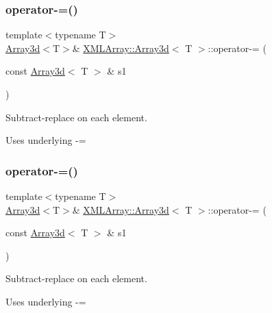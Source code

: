\subsubsection{\texorpdfstring{operator-\/=()}{operator-=()}\hspace{0.1cm}{\footnotesize\ttfamily [2/3]}}
{\footnotesize\ttfamily template$<$typename T$>$ \\
\mbox{\hyperlink{classXMLArray_1_1Array3d}{Array3d}}$<$T$>$\& \mbox{\hyperlink{classXMLArray_1_1Array3d}{X\+M\+L\+Array\+::\+Array3d}}$<$ T $>$\+::operator-\/= (\begin{DoxyParamCaption}\item[{const \mbox{\hyperlink{classXMLArray_1_1Array3d}{Array3d}}$<$ T $>$ \&}]{s1 }\end{DoxyParamCaption})\hspace{0.3cm}{\ttfamily [inline]}}



Subtract-\/replace on each element. 

Uses underlying -\/= \mbox{\label{classXMLArray_1_1Array3d_a9d4e2f24b2d52634a926ec4fb758828b}} 
\subsubsection{\texorpdfstring{operator-\/=()}{operator-=()}\hspace{0.1cm}{\footnotesize\ttfamily [3/3]}}
{\footnotesize\ttfamily template$<$typename T$>$ \\
\mbox{\hyperlink{classXMLArray_1_1Array3d}{Array3d}}$<$T$>$\& \mbox{\hyperlink{classXMLArray_1_1Array3d}{X\+M\+L\+Array\+::\+Array3d}}$<$ T $>$\+::operator-\/= (\begin{DoxyParamCaption}\item[{const \mbox{\hyperlink{classXMLArray_1_1Array3d}{Array3d}}$<$ T $>$ \&}]{s1 }\end{DoxyParamCaption})\hspace{0.3cm}{\ttfamily [inline]}}



Subtract-\/replace on each element. 

Uses underlying -\/= \mbox{\label{classXMLArray_1_1Array3d_a67c611b25c5969b9b340959fde49f602}} 

